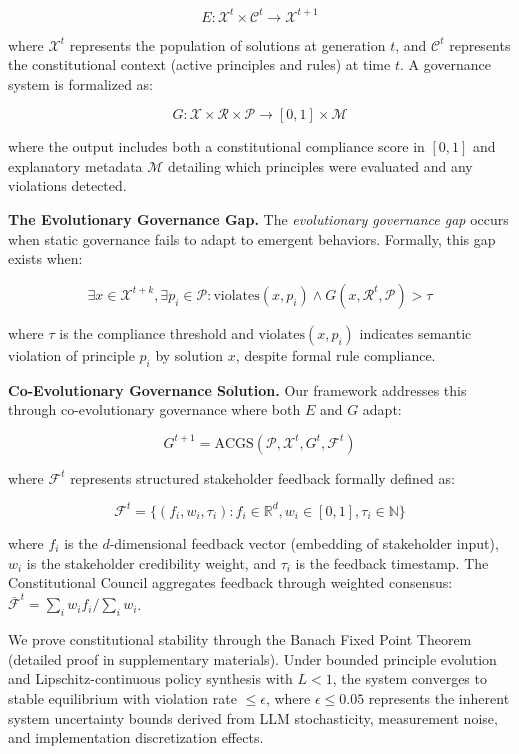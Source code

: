 \documentclass[manuscript,screen,review,anonymous,9pt]{acmart}
\begin{document}
$$E: \mathcal{X}^t \times \mathcal{C}^t \rightarrow \mathcal{X}^{t+1}$$

where $\mathcal{X}^t$ represents the population of solutions at generation $t$, and $\mathcal{C}^t$ represents the constitutional context (active principles and rules) at time $t$. A governance system is formalized as:

$$G: \mathcal{X} \times \mathcal{R} \times \mathcal{P} \rightarrow [0,1] \times \mathcal{M}$$

where the output includes both a constitutional compliance score in $[0,1]$ and explanatory metadata $\mathcal{M}$ detailing which principles were evaluated and any violations detected.

\textbf{The Evolutionary Governance Gap.} The \textit{evolutionary governance gap} occurs when static governance fails to adapt to emergent behaviors. Formally, this gap exists when:

$$\exists x \in \mathcal{X}^{t+k}, \exists p_i \in \mathcal{P}: \text{violates}(x, p_i) \land G(x, \mathcal{R}^t, \mathcal{P}) > \tau$$

where $\tau$ is the compliance threshold and $\text{violates}(x, p_i)$ indicates semantic violation of principle $p_i$ by solution $x$, despite formal rule compliance.

\textbf{Co-Evolutionary Governance Solution.} Our framework addresses this through co-evolutionary governance where both $E$ and $G$ adapt:

$$G^{t+1} = \text{ACGS}(\mathcal{P}, \mathcal{X}^t, G^t, \mathcal{F}^t)$$

where $\mathcal{F}^t$ represents structured stakeholder feedback formally defined as:

$$\mathcal{F}^t = \{(f_i, w_i, \tau_i) : f_i \in \mathbb{R}^d, w_i \in [0,1], \tau_i \in \mathbb{N}\}$$

where $f_i$ is the $d$-dimensional feedback vector (embedding of stakeholder input), $w_i$ is the stakeholder credibility weight, and $\tau_i$ is the feedback timestamp. The Constitutional Council aggregates feedback through weighted consensus: $\bar{\mathcal{F}}^t = \sum_{i} w_i f_i / \sum_{i} w_i$.

We prove constitutional stability through the Banach Fixed Point Theorem (detailed proof in supplementary materials). Under bounded principle evolution and Lipschitz-continuous policy synthesis with $L < 1$, the system converges to stable equilibrium with violation rate $\leq \epsilon$, where $\epsilon \leq 0.05$ represents the inherent system uncertainty bounds derived from LLM stochasticity, measurement noise, and implementation discretization effects.
\end{document}
